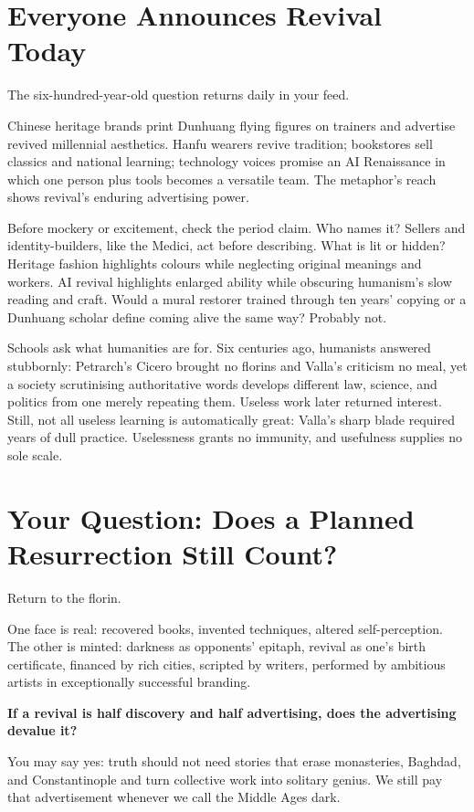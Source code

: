 \section{Everyone Announces Revival Today}
The six-hundred-year-old question returns daily in your feed.

Chinese heritage brands print Dunhuang flying figures on trainers and advertise revived millennial aesthetics. Hanfu wearers revive tradition; bookstores sell classics and national learning; technology voices promise an AI Renaissance in which one person plus tools becomes a versatile team. The metaphor's reach shows revival's enduring advertising power.

Before mockery or excitement, check the period claim. Who names it? Sellers and identity-builders, like the Medici, act before describing. What is lit or hidden? Heritage fashion highlights colours while neglecting original meanings and workers. AI revival highlights enlarged ability while obscuring humanism's slow reading and craft. Would a mural restorer trained through ten years' copying or a Dunhuang scholar define coming alive the same way? Probably not.

Schools ask what humanities are for. Six centuries ago, humanists answered stubbornly: Petrarch's Cicero brought no florins and Valla's criticism no meal, yet a society scrutinising authoritative words develops different law, science, and politics from one merely repeating them. Useless work later returned interest. Still, not all useless learning is automatically great: Valla's sharp blade required years of dull practice. Uselessness grants no immunity, and usefulness supplies no sole scale.

\section[Your Question: A Planned Resurrection?]{Your Question: Does a Planned Resurrection Still Count?}
Return to the florin.

One face is real: recovered books, invented techniques, altered self-perception. The other is minted: darkness as opponents' epitaph, revival as one's birth certificate, financed by rich cities, scripted by writers, performed by ambitious artists in exceptionally successful branding.

\textbf{If a revival is half discovery and half advertising, does the advertising devalue it?}

You may say yes: truth should not need stories that erase monasteries, Baghdad, and Constantinople and turn collective work into solitary genius. We still pay that advertisement whenever we call the Middle Ages dark.

